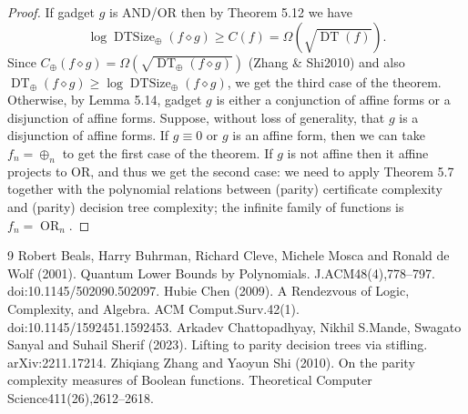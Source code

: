 \documentclass[10pt,a4paper]{article}
\newcommand{\DT}{\operatorname{DT}}
\newcommand{\DTSize}{\operatorname{DTSize}}
\newcommand{\comp}{\diamond}
\newcommand{\OR}{\operatorname{OR}}
\begin{document}
\begin{proof}
If gadget $g$ is AND/OR then by Theorem 5.12 we have
\[\log\DTSize_\oplus(f\comp g)\ge C(f)=\Omega(\sqrt{\DT(f)}).\]
Since $C_\oplus(f\comp g)=\Omega(\sqrt{\DT_\oplus(f\comp g)})$ (Zhang \& Shi2010) and also $\DT_\oplus(f\comp g)\ge\log\DTSize_\oplus(f\comp g)$, we get the third case of the theorem.
Otherwise, by Lemma 5.14, gadget $g$ is either a conjunction of affine forms or a disjunction of affine forms. Suppose, without loss of generality, that $g$ is a disjunction of affine forms. If $g\equiv0$ or $g$ is an affine form, then we can take $f_n=\oplus_n$ to get the first case of the theorem. If $g$ is not affine then it affine projects to OR, and thus we get the second case: we need to apply Theorem 5.7 together with the polynomial relations between (parity) certificate complexity and (parity) decision tree complexity; the infinite family of functions is $f_n=\OR_n$.
\end{proof}

\begin{thebibliography}{9}
 Robert Beals, Harry Buhrman, Richard Cleve, Michele Mosca and Ronald de Wolf (2001). Quantum Lower Bounds by Polynomials. J.ACM48(4),778--797. doi:10.1145/502090.502097.
 Hubie Chen (2009). A Rendezvous of Logic, Complexity, and Algebra. ACM Comput.Surv.42(1). doi:10.1145/1592451.1592453.
 Arkadev Chattopadhyay, Nikhil S.Mande, Swagato Sanyal and Suhail Sherif (2023). Lifting to parity decision trees via stifling. arXiv:2211.17214.
 Zhiqiang Zhang and Yaoyun Shi (2010). On the parity complexity measures of Boolean functions. Theoretical Computer Science411(26),2612--2618.
\end{thebibliography}
\end{document}
